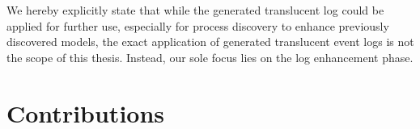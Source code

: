We hereby explicitly state that while the generated translucent log could be applied for further use, especially for process discovery to enhance previously discovered models, the exact application of generated translucent event logs is not the scope of this thesis. Instead, our sole focus lies on the log enhancement phase.

\section{Contributions}
\begin{comment}
    In this section, you list the contributions that your thesis makes to our wonderful world (of science).
Again, there is a strong link to the previous section.
Usually, you have achieved your research goals.
Hence, the contributions are concrete statements of the goals you have achieved.
Additionally, your evaluation (most likely also stressed as a goal) is a contribution.
Any implementation or prototype can also be quantified as a contribution.

Some examples:
\begin{itemize}
	\item A systematic literature review covering 35 articles on noise patterns in real event data
	\item A noise detection algorithm based on dynamic programming and symbolic linking
	\item ...
\end{itemize}
\end{comment}




